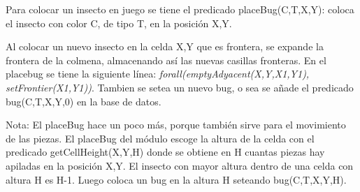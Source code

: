 \documentclass[12pt,letterpaper]{article}
\begin{document}
	 Para colocar un insecto en juego se tiene el predicado placeBug(C,T,X,Y): coloca el insecto con color C, de tipo T, en la posici\'on X,Y.
	 
	 Al colocar un nuevo insecto en la celda X,Y que es frontera, se expande la frontera de la colmena, almacenando as\'i las nuevas casillas fronteras. En el placebug se tiene la siguiente l\'inea: \textit{ forall(emptyAdyacent(X,Y,X1,Y1), setFrontier(X1,Y1))}. Tambien se setea un nuevo bug, o sea se a\~nade el predicado bug(C,T,X,Y,0) en la base de datos.
	 
	 Nota: El placeBug hace un poco m\'as, porque tambi\'en sirve para el movimiento de las piezas. El placeBug del m\'odulo escoge la altura de la celda con el predicado getCellHeight(X,Y,H) donde se obtiene en H cuantas piezas hay apiladas en la posici\'on X,Y. El insecto con mayor altura dentro de una celda con altura H es H-1. Luego coloca un bug en la altura H seteando bug(C,T,X,Y,H).
\end{document}
